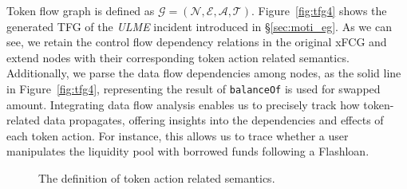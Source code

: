 Token flow graph is defined as $\mathcal{G} = (\mathcal{N}, \mathcal{E}, \mathcal{A}, \mathcal{T})$.
Figure~\ref{fig:tfg4} shows the generated TFG of the \textit{ULME} incident introduced in \S{\ref{sec:moti_eg}}.
As we can see, we retain the control flow dependency relations in the original xFCG and extend nodes with their corresponding token action related semantics. 
Additionally, we parse the data flow dependencies among nodes, as the solid line in Figure~\ref{fig:tfg4}, representing the result of \texttt{balanceOf} is used for swapped amount.
Integrating data flow analysis enables us to precisely track how token-related data propagates, offering insights into the dependencies and effects of each token action. For instance, this allows us to trace whether a user manipulates the liquidity pool with borrowed funds following a Flashloan.

\begin{figure}[t!]
\centering
{}
\vspace{-0.1in}
\caption{The definition of token action related semantics.}
\vspace{-0.1in}
\label{fig:syntax-dsl}
\end{figure}





